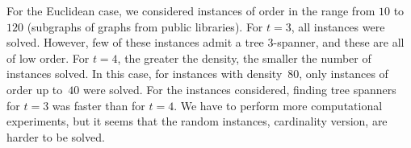 \documentclass[12pt]{article}
\begin{document}
For the Euclidean case, we considered instances of order in the range
from $10$ to $120$ (subgraphs of graphs from public libraries).  For
$t = 3$, all instances were solved. However, few of these instances
admit a tree \hbox{$3$-spanner}, and these are all of low order. For
$t = 4$, the greater the density, the smaller the number of instances
solved. In this case, for instances with density~$80$, only instances
of order up to~$40$ were solved.  For the instances considered,
finding tree spanners for $t=3$ was faster than for $t=4$. We have to
perform more computational experiments, but it seems that the random
instances, cardinality version, are harder to be solved. 




\end{document}
